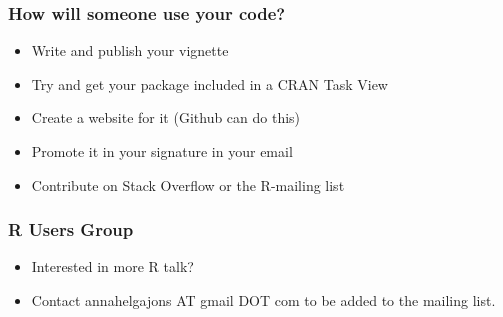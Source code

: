\documentclass[xcolor=svgnames]{beamer}
\begin{document}
\begin{frame}
  \frametitle{How will someone use your code?}
  \begin{itemize}
  \item Write and publish your vignette
  \item Try and get your package included in a CRAN Task View
  \item Create a website for it (Github can do this)
  \item Promote it in your signature in your email
  \item Contribute on Stack Overflow or the R-mailing list 
  \end{itemize}

  \end{frame}

\begin{frame}
\frametitle{R Users Group}
\begin{itemize}
\item Interested in more R talk?
\item Contact annahelgajons AT gmail DOT com to be added to the mailing list. 
\end{itemize}
\end{frame}
  
\end{document}
